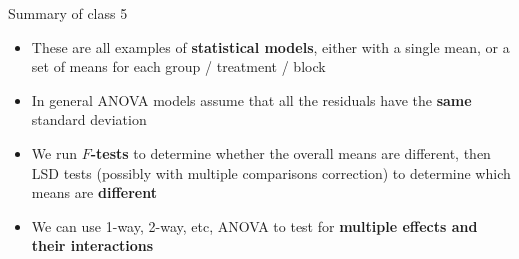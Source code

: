 \documentclass[12pt,xcolor=dvipsnames,handout,mathserif,aspectratio=169]{beamer}
\newcommand{\bbl}[1]{{\color{NavyBlue} \textbf{#1}}}
\newcommand{\bre}[1]{{\color{red} \textbf{#1}}}
\newcommand{\bgr}[1]{{\color{PineGreen} \textbf{#1}}}
\newcommand{\tc}{\textcolor}
\begin{document}
%
%
%

\begin{frame}{Summary of class 5}

\begin{itemize}
\item These are all examples of \bgr{statistical models}, either with a single mean, or a set of means for each group / treatment / block
\item In general ANOVA models assume that all the residuals have the \bre{same} standard deviation
\item We run \bbl{$F$-tests} to determine whether the overall means are different, then LSD tests (possibly with multiple comparisons correction) to determine which means are \bgr{different}
\item We can use 1-way, 2-way, etc, ANOVA to test for \bgr{multiple effects and their interactions}
\end{itemize}
\end{frame}
\end{document}
